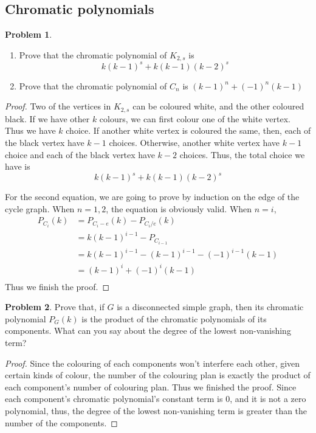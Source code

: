 \documentclass[a4paper,11pt]{article}%
\theoremstyle{remark}
\theoremstyle{definition}
\newtheorem{problem}{Problem}[subsection]
\begin{document}
\subsection{Chromatic polynomials}
\begin{problem}
    \begin{enumerate}
        \item Prove that the chromatic polynomial of $K_{2,s}$ is 
        \[k(k-1)^s+k(k-1)(k-2)^s\]
        \item Prove that the chromatic polynomial of $C_n$ is $(k-1)^n+(-1)^n(k-1)$
    \end{enumerate}
    \begin{proof}
       Two of the vertices in $K_{2,s}$ can be coloured white, and the other coloured black.
       If we have other $k$ colours, we can first colour one of the white vertex. Thus we have $k$
       choice. If another white vertex is coloured the same, then, each of the black vertex have $k-1$ choices.
       Otherwise, another white vertex have $k-1$ choice and each of the black vertex have $k-2$ choices.
       Thus, the total choice we have is 
       \[k(k-1)^s+k(k-1)(k-2)^s\]

       For the second equation, we are going to prove by induction on the edge of the cycle graph.
       When $n=1,2$, the equation is obviously valid.
       When $n=i$,
       \[\begin{array}{rl}
        P_{C_i}(k)&=P_{C_i-e}(k)-P_{C_i/e}(k)\\
        &=k(k-1)^{i-1}-P_{C_{i-1}}\\
        &=k(k-1)^{i-1}-(k-1)^{i-1}-(-1)^{i-1}(k-1)\\
        &=(k-1)^i+(-1)^i(k-1)\\
       \end{array}
       \]
       Thus we finish the proof.
    \end{proof}
\end{problem}
\begin{problem}
    Prove that, if $G$ is a disconnected simple graph, then its chromatic polynomial $P_G(k)$ is the product of the chromatic polynomials 
    of its components. What can you say about the degree of the lowest non-vanishing term?
\begin{proof}
    Since the colouring of each components won't interfere each other, given certain kinds of colour, the 
 number of the colouring plan is exactly the product of each component's number of colouring plan.
 Thus we finished the proof. Since each component's chromatic polynomial's constant term is 0, and it is not a 
 zero polynomial, thus, the degree of the lowest non-vanishing term is greater than the number of the components.
\end{proof}
\end{problem}
\end{document}
